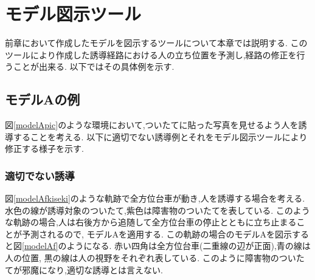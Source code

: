 \chapter{モデル図示ツール}
前章において作成したモデルを図示するツールについて本章では説明する.
このツールにより作成した誘導経路における人の立ち位置を予測し,経路の修正を行うことが出来る.
以下ではその具体例を示す.

\section{モデルAの例}
図\ref{modelApic}のような環境において,ついたてに貼った写真を見せるよう人を誘導することを考える.
以下に適切でない誘導例とそれをモデル図示ツールにより修正する様子を示す.

\begin{comment}
\begin{figure}[!h]
\begin{center}
\texttt{[image: modelApic.eps]}
\caption{モデルA検証環境}
\label{modelApic}
\end{center}
\end{figure}
\end{comment}

\subsection{適切でない誘導}
図\ref{modelAfkiseki}のような軌跡で全方位台車が動き,人を誘導する場合を考える.
水色の線が誘導対象のついたて,紫色は障害物のついたてを表している.
このような軌跡の場合,人は右後方から追随して全方位台車の停止とともに立ち止まることが予測されるので,
モデルAを適用する.
この軌跡の場合のモデルAを図示すると図\ref{modelAf}のようになる.
赤い四角は全方位台車(二重線の辺が正面),青の線は人の位置,
黒の線は人の視野をそれぞれ表している.
このように障害物のついたてが邪魔になり,適切な誘導とは言えない.

\begin{comment}
\begin{figure}[htbp]
 \begin{minipage}{0.5\hsize}
\begin{center}
\texttt{[image: modelAfkiseki.eps]}
\caption{モデルAにおける適切でない誘導の軌跡}
\label{modelAfkiseki}
\end{center}
 \end{minipage}
 \begin{minipage}{0.5\hsize}
\begin{center}
\texttt{[image: modelAf.eps]}
\caption{モデルAの図示(適切でない例)}
\label{modelAf}
\end{center}
 \end{minipage}
\end{figure}
\end{comment}

